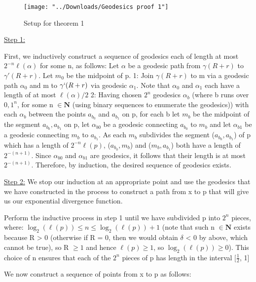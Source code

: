\documentclass[11pt]{article}
\newcommand{\vs}{\vskip10pt}
\begin{document}
		\begin{figure}[h]
		\centering
		\texttt{[image: "../Downloads/Geodesics proof 1"]}
		\caption{Setup for theorem 1}
		\label{Figure 4: Setup for theorem 1}
		
	\end{figure}
	
	\vs
	
	\underline{Step 1:}
	
	First, we inductively construct a sequence of geodesics each of length at most $2^{-n} \ell(\alpha)$ for some n, as follows: 
	Let $\alpha$ be a geodesic path from $\gamma(R+r)$ to $\gamma'(R+r)$. Let $m_0$ be the midpoint of p. 
	\vs
	1: Join $\gamma(R+r)$ to m via a geodesic path $\alpha_0$ and m to $\gamma`(R+r)$ via geodesic $\alpha_1$. Note that $\alpha_0$ and $\alpha_1$ each have a length of at most $\ell(\alpha)/2$
	\vs
	2: Having chosen $2^n$ geodesics $\alpha_b$ (where b runs over ${0,1}^n$, for some n $\in \mathbf{N}$ (using binary sequences to enumerate the geodesics)) with each $\alpha_b$ between the points $a_{b_0}$ and $a_{b_1}$ on p, for each b let $m_b$ be the midpoint of the segment $a_{b_0},a_{b_1}$ on p, let $\alpha_{b0}$ be a geodesic connecting $a_{b_0}$ to $m_b$ and let $\alpha_{b1}$ be a geodesic connecting $m_b$ to $a_{b_1}$. As each $m_b$ subdivides the segment ($a_{b_0}, a_{b_1}$) of p which has a length of $2^{-n} \ell(p)$, ($a_{b_0}, m_b$) and ($m_b, a_{b_1}$) both have a length of $2^{-(n+1)}$. Since $\alpha_{b0}$ and $\alpha_{b1}$ are geodesics, it follows that their length is at most $2^{-(n+1)}$. 
	\vs
	Therefore, by induction, the desired sequence of geodesics exists. 
	\vs 
	
	\underline{Step 2:} We stop our induction at an appropriate point and use the geodesics that we have constructed in the process to construct a path from x to p that will give us our exponential divergence function. 
	\vs 
	
	Perform the inductive process in step 1 until we have subdivided p into $2^n$ pieces, where: $\log_2(\ell(p)) \leq n \leq \log_2(\ell(p)) + 1$ (note that such n $\in \mathbf{N}$ exists because R > 0 (otherwise if R = 0, then we would obtain $\delta$ < 0 by above, which cannot be true), so R $\geq 1$ and hence $\ell(p) \geq 1$, so $\log_2(\ell(p)) \geq 0$). This choice of n ensures that each of the $2^n$ pieces of p has length in the interval [$\frac{1}{2}$, 1]
	
	We now construct a sequence of points from x to p as follows: 
	
\end{document}
